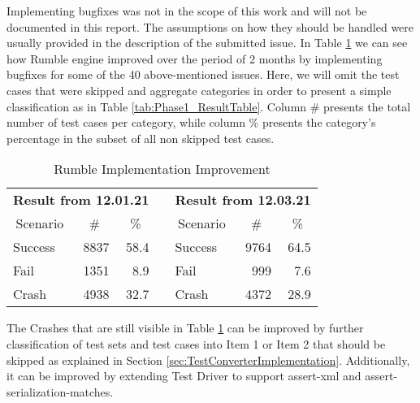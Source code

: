 Implementing bugfixes was not in the scope of this work and will not be documented in this report. The assumptions on how they should be handled were usually provided in the description of the submitted issue. In Table \ref{tab:bugsimprovement} we can see how Rumble engine improved over the period of 2 months by implementing bugfixes for some of the 40 above-mentioned issues. Here, we will omit the test cases that were skipped and aggregate categories in order to present a simple classification as in Table \ref{tab:Phase1_ResultTable}. Column \# presents the total number of test cases per category, while column \% presents the category's percentage in the subset of all non skipped test cases.
 
\begin{table}[h!]
	\centering
	\begin{tabular}{|l|r|r|r|l|r|r|}
		\cline{1-3} \cline{5-7}
		\multicolumn{3}{|c|}{\textbf{Result from 12.01.21}}                                & \multicolumn{1}{l|}{}          & \multicolumn{3}{c|}{\textbf{Result from 12.03.21}}                                \\ \cline{1-3} \cline{5-7} 
		\multicolumn{1}{|c|}{Scenario} & \multicolumn{1}{c|}{\#} & \multicolumn{1}{c|}{\%} & \multicolumn{1}{c|}{\textbf{}} & \multicolumn{1}{c|}{Scenario} & \multicolumn{1}{c|}{\#} & \multicolumn{1}{c|}{\%} \\ \cline{1-3} \cline{5-7} 
		Success                        & 8837                    & 58.4                    &                                & Success                       & 9764                    & 64.5                    \\ \cline{1-3} \cline{5-7} 
		Fail                           & 1351                    & 8.9                     &                                & Fail                          & 999                     & 7.6                     \\ \cline{1-3} \cline{5-7} 
		Crash                          & 4938                    & 32.7                    &                                & Crash                         & 4372                    & 28.9                    \\ \cline{1-3} \cline{5-7} 
	\end{tabular}
	\caption{Rumble Implementation Improvement}
	\label{tab:bugsimprovement}
\end{table}

The Crashes that are still visible in Table \ref{tab:bugsimprovement} can be improved by further classification of test sets and test cases into Item 1 or Item 2 that should be skipped as explained in Section \ref{sec:TestConverterImplementation}. Additionally, it can be improved by extending Test Driver to support assert-xml and assert-serialization-matches.

